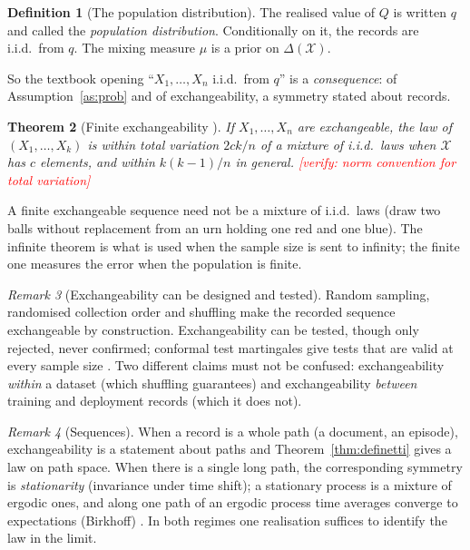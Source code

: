 \documentclass[11pt]{article}
\theoremstyle{definition}
\newtheorem{definition}{Definition}[section]
\theoremstyle{plain}
\newtheorem{theorem}[definition]{Theorem}
\theoremstyle{remark}
\newtheorem{remark}[definition]{Remark}
\newcommand{\verify}[1]{\textcolor{red}{[verify: #1]}}
\newcommand{\X}{\mathcal{X}}
\newcommand{\Prob}{\Delta}
\begin{document}
\begin{definition}[The population distribution]
The realised value of $Q$ is written $q$ and called the
\emph{population distribution}. Conditionally on it, the records are
i.i.d.\ from $q$. The mixing measure $\mu$ is a prior on $\Prob(\X)$.
\end{definition}

So the textbook opening ``$X_1,\dots,X_n$ i.i.d.\ from $q$'' is a
\emph{consequence}: of Assumption~\ref{as:prob} and of exchangeability,
a symmetry stated about records.

\begin{theorem}[Finite exchangeability \cite{diaconis1980finite}]
If $X_1,\dots,X_n$ are exchangeable, the law of $(X_1,\dots,X_k)$ is
within total variation $2ck/n$ of a mixture of i.i.d.\ laws when $\X$
has $c$ elements, and within $k(k-1)/n$ in general.
\verify{norm convention for total variation}
\end{theorem}

A finite exchangeable sequence need not be a mixture of i.i.d.\ laws
(draw two balls without replacement from an urn holding one red and
one blue). The infinite theorem is what is used when the sample size
is sent to infinity; the finite one measures the error when the
population is finite.

\begin{remark}[Exchangeability can be designed and tested]
Random sampling, randomised collection order and shuffling make the
recorded sequence exchangeable by construction. Exchangeability can be
tested, though only rejected, never confirmed; conformal test
martingales give tests that are valid at every sample size
\cite{vovk2003testing}. Two different claims must not be confused:
exchangeability \emph{within} a dataset (which shuffling guarantees)
and exchangeability \emph{between} training and deployment records
(which it does not).
\end{remark}

\begin{remark}[Sequences]
When a record is a whole path (a document, an episode), exchangeability
is a statement about paths and Theorem~\ref{thm:definetti} gives a law
on path space. When there is a single long path, the corresponding
symmetry is \emph{stationarity} (invariance under time shift); a
stationary process is a mixture of ergodic ones, and along one path of
an ergodic process time averages converge to expectations (Birkhoff)
\cite{kallenberg2002}. In both regimes one realisation suffices to
identify the law in the limit.
\end{remark}
\end{document}
